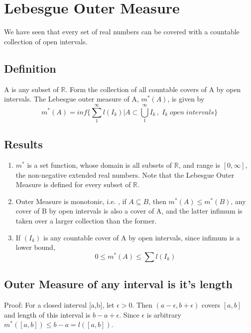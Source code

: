 \documentclass{article}
\begin{document}
\section{Lebesgue Outer Measure}

We have seen that every set of real numbers can be covered with a countable collection of open intervals.

\subsection{Definition}

A is any subset of $\mathbb{R}$. Form the collection of all countable covers of A by open intervals. The Lebesgue outer measure of A, $m^*(A)$, is given by
$$m^*(A)= inf\Big\{\sum_{1}^{\infty}l(I_k)| A \subset \bigcup_{1}^{\infty} I_k \, , \; I_k \; open \; intervals\Big\}$$

\subsection{Results}
\begin{enumerate}
    \item $m^*$ is a set function, whose domain is all subsets of $\mathbb{R}$, and range is $[0,\infty]$, the non-negative extended real numbers. Note that the Lebesgue Outer Measure is defined for every subset of $\mathbb{R}$.
    
    \item Outer Measure is monotonic, i.e. , if $A \subseteq B$, then $m^*(A) \leq m^*(B)$, any cover of B by open intervals is also a cover of A, and the latter infimum is taken over a larger collection than the former. 

    \item If $(I_k)$ is any countable cover of A by open intervals, since infimum is a lower bound,$$ 0 \leq m^*(A) \leq \sum l(I_k)$$
    


\end{enumerate}

\subsection{Outer Measure of any interval is it's length}

Proof:  
For a closed interval [a,b], let $\epsilon >0$. Then $(a-\epsilon,b+\epsilon)$ covers $[a,b]$ and length of this interval is $b-a+\epsilon$. Since $\epsilon$ is arbitrary $m^*([a,b]) \leq b-a = l([a,b])$.
\end{document}

